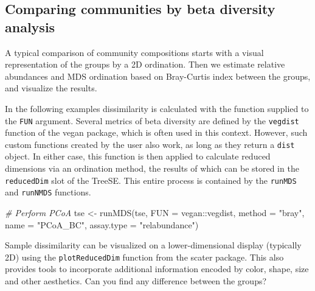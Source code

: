 \documentclass[
]{book}
\newenvironment{Shaded}{\begin{snugshade}}{\end{snugshade}}
\newcommand{\AttributeTok}[1]{\textcolor[rgb]{0.77,0.63,0.00}{#1}}
\newcommand{\CommentTok}[1]{\textcolor[rgb]{0.56,0.35,0.01}{\textit{#1}}}
\newcommand{\FunctionTok}[1]{\textcolor[rgb]{0.00,0.00,0.00}{#1}}
\newcommand{\NormalTok}[1]{#1}
\newcommand{\OtherTok}[1]{\textcolor[rgb]{0.56,0.35,0.01}{#1}}
\newcommand{\SpecialCharTok}[1]{\textcolor[rgb]{0.00,0.00,0.00}{#1}}
\newcommand{\StringTok}[1]{\textcolor[rgb]{0.31,0.60,0.02}{#1}}
\begin{document}
\hypertarget{comparing-communities-by-beta-diversity-analysis}{%
\subsection{Comparing communities by beta diversity analysis}\label{comparing-communities-by-beta-diversity-analysis}}

A typical comparison of community compositions starts with a visual
representation of the groups by a 2D ordination. Then we estimate relative
abundances and MDS ordination based on Bray-Curtis index between the groups,
and visualize the results.

In the following examples dissimilarity is calculated with the function supplied
to the \texttt{FUN} argument. Several metrics of beta diversity are defined by the \texttt{vegdist}
function of the vegan package, which is often used in this context. However, such
custom functions created by the user also work, as long as they return a \texttt{dist}
object. In either case, this function is then applied to calculate reduced
dimensions via an ordination method, the results of which can be stored in the
\texttt{reducedDim} slot of the TreeSE. This entire process is contained by the \texttt{runMDS}
and \texttt{runNMDS} functions.

\begin{Shaded}
\begin{Highlighting}[]
\CommentTok{\# Perform PCoA}
\NormalTok{tse }\OtherTok{\textless{}{-}} \FunctionTok{runMDS}\NormalTok{(tse,}
              \AttributeTok{FUN =}\NormalTok{ vegan}\SpecialCharTok{::}\NormalTok{vegdist,}
              \AttributeTok{method =} \StringTok{"bray"}\NormalTok{,}
              \AttributeTok{name =} \StringTok{"PCoA\_BC"}\NormalTok{,}
              \AttributeTok{assay.type =} \StringTok{"relabundance"}\NormalTok{)}
\end{Highlighting}
\end{Shaded}

Sample dissimilarity can be visualized on a lower-dimensional display (typically
2D) using the \texttt{plotReducedDim} function from the scater package. This also
provides tools to incorporate additional information encoded by color, shape,
size and other aesthetics. Can you find any difference between the groups?
\end{document}
